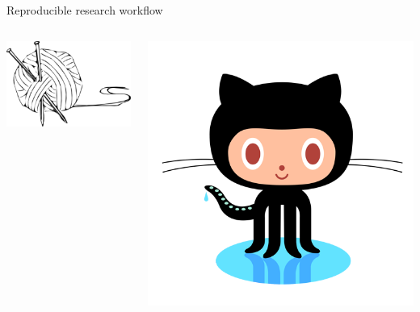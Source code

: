 \documentclass[serif]{beamer}\usepackage[]{graphicx}\usepackage[]{color}
\begin{document}
\begin{frame}{Reproducible research workflow}
\begin{columns}
\begin{column}{0.25\textwidth}
\centerline{\includegraphics[width = \textwidth]{fig/knit-logo.png}}
\end{column}
\begin{column}{0.25\textwidth}
\centerline{\includegraphics[width = \textwidth]{fig/octocat.png}}
\end{column}
\end{columns}
\end{frame}
\end{document}
